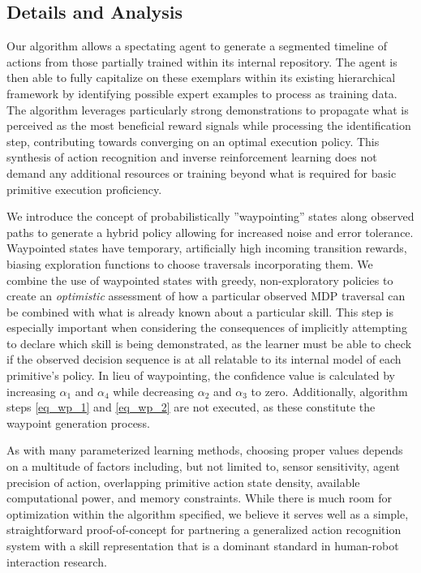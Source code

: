\documentclass[letterpaper]{article}
\begin{document}
\subsection{Details and Analysis}
\label{sec:recognition_analysis}
Our algorithm allows a spectating agent to generate a segmented timeline of actions from those partially trained within its internal repository. The agent is then able to fully capitalize on these exemplars within its existing hierarchical framework by identifying possible expert examples to process as training data. The algorithm leverages particularly strong demonstrations to propagate what is perceived as the most beneficial reward signals while processing the identification step, contributing towards converging on an optimal execution policy. This synthesis of action recognition and inverse reinforcement learning does not demand any additional resources or training beyond what is required for basic primitive execution proficiency.

We introduce the concept of probabilistically ''waypointing'' states along observed paths to generate a hybrid policy allowing for increased noise and error tolerance. Waypointed states have temporary, artificially high incoming transition rewards, biasing exploration functions to choose traversals incorporating them. We combine the use of waypointed states with greedy, non-exploratory policies to create an \textit{optimistic} assessment of how a particular observed MDP traversal can be combined with what is already known about a particular skill. This step is especially important when considering the consequences of implicitly attempting to declare which skill is being demonstrated, as the learner must be able to check if the observed decision sequence is at all relatable to its internal model of each primitive's policy. In lieu of waypointing, the confidence value is calculated by increasing $\alpha_1$ and $\alpha_4$ while decreasing $\alpha_2$ and $\alpha_3$ to zero. Additionally, algorithm steps \ref{eq_wp_1} and \ref{eq_wp_2} are not executed, as these constitute the waypoint generation process.

As with many parameterized learning methods, choosing proper values depends on a multitude of factors including, but not limited to, sensor sensitivity, agent precision of action, overlapping primitive action state density, available computational power, and memory constraints. While there is much room for optimization within the algorithm specified, we believe it serves well as a simple, straightforward proof-of-concept for partnering a generalized action recognition system with a skill representation that is a dominant standard in human-robot interaction research.
\end{document}
